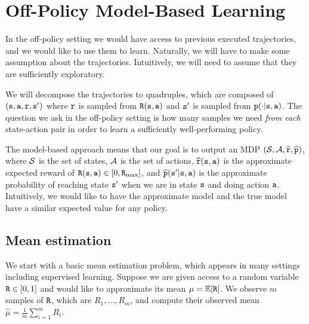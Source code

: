 \section{Off-Policy Model-Based Learning}

In the off-policy setting we would have access to previous executed
trajectories, and we would like to use them to learn. Naturally, we
will have to make some assumption about the trajectories.
Intuitively, we will need to assume that they are sufficiently
exploratory. 

We will decompose the trajectories to quadruples, which are composed
of
$
({\tt s},{\tt a},{\tt r},{\tt s}')
$
where ${\tt r}$ is sampled from ${\tt R}({\tt s},{\tt a})$ and
${\tt s}'$ is sampled from ${\tt p}(\cdot|{\tt s},{\tt a})$.
The question we ask in the off-policy setting is how many samples we need \textit{from each} state-action pair in order to learn a sufficiently well-performing policy.

The model-based approach means that our goal is to output an MDP
$(\mathcal{S},\mathcal{A},\widehat{{\tt r}},\widehat{{\tt p}})$, where $\mathcal{S}$
is the set of states, $\mathcal{A}$ is the set of actions,
$\widehat{{\tt r}}({\tt s},{\tt a})$ is the approximate expected
reward of ${\tt R}({\tt s},{\tt a})\in[0,{\tt R}_{\max }]$, and
$\widehat{{\tt p}}({\tt s}'|{\tt s},{\tt a})$ is the approximate probability
of reaching state ${\tt s}'$ when we are in state ${\tt s}$ and doing
action ${\tt a}$. Intuitively, we would like to have the approximate
model and the true model have a similar expected value for any policy.

\subsection{Mean estimation}

We start with a basic mean estimation problem, which appears in many
settings including supervised learning.
Suppose we are given access to a random variable ${\tt R}\in[0,1]$
and would like to approximate its mean $\mu=\mathbb{E}[{\tt R}]$. We
observe $m$ samples of ${\tt R}$, which are $R_1, \ldots, R_m$, and
compute their observed mean $\widehat{\mu}=\frac{1}{m}\sum_{i=1}^m
R_i$.

